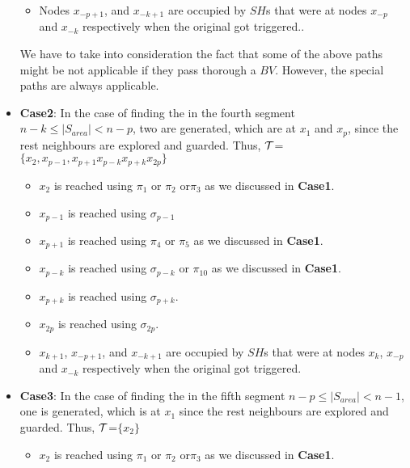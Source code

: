 \begin{itemize}
\begin{itemize}
\begin{itemize}
\end{itemize}
\item Nodes $x_{-p+1}$, and $x_{-k+1}$ are occupied by $SH$s that were at nodes  $x_{-p}$ and $x_{-k}$ respectively when the original \bv got triggered.. 
\end{itemize}
We have to take into consideration the fact that some of the above paths might be not applicable if they pass thorough a $BV$. However, the special paths are always applicable.

 \item {\bf Case2}: In the case of finding the \bv in the fourth segment $n-k\leq |S_{area}| <n-p$, two \bvs are generated, which are at $x_1$ and $x_p$, since the rest neighbours are explored and guarded. Thus,
$\cal T$=$\{x_2,x_{p-1},x_{p+1}x_{p-k}x_{p+k}x_{2p}\}$
\begin{itemize}
\item $x_2$ is reached using $\pi_1$ or $\pi_2$ or$\pi_3$ as we discussed in {\bf Case1}.
\item $x_{p-1}$ is reached using $\sigma_{p-1}$
\item $x_{p+1}$ is reached using $\pi_4$ or $\pi_5$  as we discussed in {\bf Case1}.
\item $x_{p-k}$ is reached using $\sigma_{p-k}$ or $\pi_{10}$ as we discussed in {\bf Case1}.
\item $x_{p+k}$ is reached using $\sigma_{p+k}$.
\item $x_{2p}$ is reached using $\sigma_{2p}$.
\item $x_{k+1}$, $x_{-p+1}$, and $x_{-k+1}$ are occupied by $SH$s that were at nodes $x_{k}$, $x_{-p}$ and $x_{-k}$ respectively when the original \bv got triggered. 
\end{itemize}

\item {\bf Case3}: In the case of finding the \bv in the fifth segment $n-p\leq |S_{area}| <n-1$, one \bv is generated, which is at $x_1$ since the rest neighbours are explored and guarded. Thus,
$\cal T$=$\{x_2\}$ 
\begin{itemize}
\item $x_2$ is reached using $\pi_1$ or $\pi_2$ or$\pi_3$ as we discussed in {\bf Case1}.


\end{itemize}
\end{itemize}
